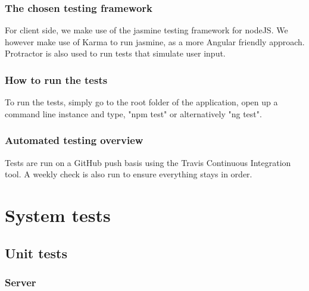 \documentclass[a4paper,12pt]{article}
\begin{document}
	    \subsubsection{The chosen testing framework}
	    
    	For client side, we make use of the jasmine testing framework for nodeJS. We however make use of Karma to run jasmine, as a more Angular friendly approach. Protractor is also used to run tests that simulate user input.
	    
	    \subsubsection{How to run the tests}
	    
	     To run the tests, simply go to the root folder of the application, open up a command line instance and type, "npm test" or alternatively "ng test".
	    
	    \subsubsection{Automated testing overview} 
	    
	    Tests are run on a GitHub push basis using the Travis Continuous Integration tool. A weekly check is also run to ensure everything stays in order.
      
    \pagebreak 
    \section{System tests}
    
    	\subsection{Unit tests}
    	
    		\subsubsection{Server}
    		
\end{document}
